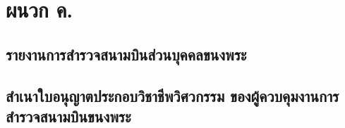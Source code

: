 
\chapter{ผนวก ค.}

\section{รายงานการสำรวจสนามบินส่วนบุคคลขนงพระ} \label{รายงานการสำรวจสนามบินส่วนบุคคลขนงพระ}




\section{สำเนาใบอนุญาตประกอบวิชาชีพวิศวกรรม ของผู้ควบคุมงานการสำรวจสนามบินขนงพระ}


